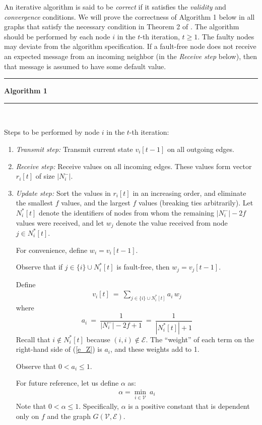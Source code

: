 \documentclass[letterpaper, 12pt]{article}
\newcommand{\scripte}{\mathcal{E}}
\newcommand{\scriptv}{\mathcal{V}}
\begin{document}
An iterative algorithm is said to be {\em correct} if it satisfies
the {\em validity} and {\em convergence} conditions.
We will prove the correctness of Algorithm 1 below
 in all graphs that satisfy the
necessary condition in Theorem 2 of \cite{us}. The algorithm
should be performed by each node $i$ in the
$t$-th iteration, $t\geq 1$. The faulty nodes may deviate from the
algorithm specification. If a fault-free node does not receive an
expected message from an incoming neighbor (in the {\em Receive step}
below), then that message is assumed to have some default value.


\vspace*{8pt}\hrule

{\bf Algorithm 1}
\vspace*{4pt}\hrule

~

Steps to be performed by node $i$ in the $t$-th iteration:
\begin{enumerate}

\item {\em Transmit step:} Transmit current state $v_i[t-1]$ on all outgoing edges.
\item {\em Receive step:} Receive values on all incoming edges. These values form
vector $r_i[t]$ of size $|N_i^-|$.


\item {\em Update step:}
Sort the values in $r_i[t]$ in an increasing order, and eliminate
the smallest $f$ values, and the largest $f$ values (breaking ties
arbitrarily).
 Let $N_i^*[t]$ denote the identifiers of nodes from
whom the remaining $|N_i^-| - 2f$ values were received, and let
$w_j$ denote the value received from node $j\in N_i^*[t]$.

For convenience, define $w_i=v_i[t-1]$.

Observe that
if $j\in \{i\}\cup N_i^*[t]$ is fault-free, then $w_j=v_j[t-1]$.

Define
\begin{eqnarray}
v_i[t] ~ = ~\sum_{j\in \{i\}\cup N_i^*[t]} a_i \, w_j
\label{e_Z}
\end{eqnarray}
where
\[ a_i ~=~ \frac{1}{|N_i^-|-2f+1} ~=~
 \frac{1}{|N_i^*[t]|+1}
\] 
Recall that
 $i\not\in N_i^*[t]$
because $(i,i)\not\in\scripte$.
The ``weight'' of each term on the right-hand side of
(\ref{e_Z}) is $a_i$, and these weights add to 1.

Observe that $0<a_i\leq 1$.


For future reference, let us define $\alpha$ as:
\begin{eqnarray}
\alpha = \min_{i\in \scriptv}~a_i
\label{e_alpha}
\end{eqnarray}
Note that $0<\alpha\leq 1$.
Specifically, $\alpha$ is a positive constant
that is dependent only on $f$ and the graph $G(\scriptv,\scripte)$.

\end{enumerate}
\end{document}
